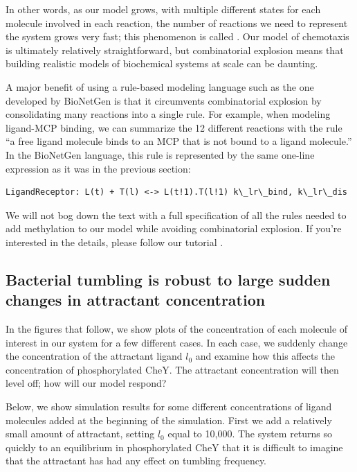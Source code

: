 In other words, as our model grows, with multiple different states for each molecule involved in each reaction, the number of reactions we need to represent the system grows very fast; this phenomenon is called . Our model of chemotaxis is ultimately relatively straightforward, but combinatorial explosion means that building realistic models of biochemical systems at scale can be daunting.

A major benefit of using a rule-based modeling language such as the one developed by BioNetGen is that it circumvents combinatorial explosion by consolidating many reactions into a single rule. For example, when modeling ligand-MCP binding, we can summarize the 12 different reactions with the rule ``a free ligand molecule binds to an MCP that is not bound to a ligand molecule.'' In the BioNetGen language, this rule is represented by the same one-line expression as it was in the previous section:

\begin{verbatim}
LigandReceptor: L(t) + T(l) <-> L(t!1).T(l!1) k\_lr\_bind, k\_lr\_dis
\end{verbatim}

We will not bog down the text with a full specification of all the rules needed to add methylation to our model while avoiding combinatorial explosion. If you're interested in the details, please follow our tutorial .


\FloatBarrier
{}
\subsection{Bacterial tumbling is robust to large sudden changes in attractant concentration}

In the figures that follow, we show plots of the concentration of each molecule of interest in our system for a few different cases. In each case, we suddenly change the concentration of the attractant ligand $l_0$ and examine how this affects the concentration of phosphorylated CheY. The attractant concentration will then level off; how will our model respond?

Below, we show simulation results for some different concentrations of ligand molecules added at the beginning of the simulation. First we add a relatively small amount of attractant, setting $l_0$ equal to 10,000. The system returns so quickly to an equilibrium in phosphorylated CheY that it is difficult to imagine that the attractant has had any effect on tumbling frequency.

